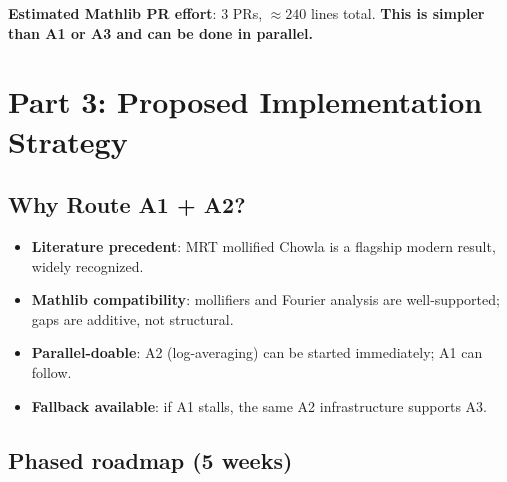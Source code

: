 \documentclass[11pt,a4paper]{article}
\begin{document}
\textbf{Estimated Mathlib PR effort}: 3 PRs, $\approx 240$ lines total. \textbf{This is simpler than A1 or A3 and can be done in parallel.}

\section{Part 3: Proposed Implementation Strategy}

\subsection{Why Route A1 + A2?}

\begin{itemize}
\item \textbf{Literature precedent}: MRT mollified Chowla is a flagship modern result, widely recognized.
\item \textbf{Mathlib compatibility}: mollifiers and Fourier analysis are well-supported; gaps are additive, not structural.
\item \textbf{Parallel-doable}: A2 (log-averaging) can be started immediately; A1 can follow.
\item \textbf{Fallback available}: if A1 stalls, the same A2 infrastructure supports A3.
\end{itemize}

\subsection{Phased roadmap (5 weeks)}
\end{document}
